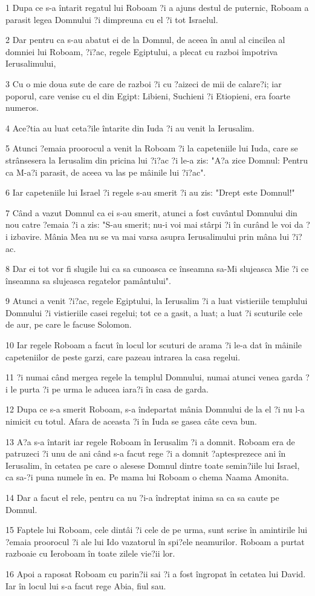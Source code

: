 \par 1 Dupa ce s-a întarit regatul lui Roboam ?i a ajuns destul de puternic, Roboam a parasit legea Domnului ?i dimpreuna cu el ?i tot Israelul.
\par 2 Dar pentru ca s-au abatut ei de la Domnul, de aceea în anul al cincilea al domniei lui Roboam, ?i?ac, regele Egiptului, a plecat cu razboi împotriva Ierusalimului,
\par 3 Cu o mie doua sute de care de razboi ?i cu ?aizeci de mii de calare?i; iar poporul, care venise cu el din Egipt: Libieni, Suchieni ?i Etiopieni, era foarte numeros.
\par 4 Ace?tia au luat ceta?ile întarite din Iuda ?i au venit la Ierusalim.
\par 5 Atunci ?emaia proorocul a venit la Roboam ?i la capeteniile lui Iuda, care se strânsesera la Ierusalim din pricina lui ?i?ac ?i le-a zis: "A?a zice Domnul: Pentru ca M-a?i parasit, de aceea va las pe mâinile lui ?i?ac".
\par 6 Iar capeteniile lui Israel ?i regele s-au smerit ?i au zis: "Drept este Domnul!"
\par 7 Când a vazut Domnul ca ei s-au smerit, atunci a fost cuvântul Domnului din nou catre ?emaia ?i a zis: "S-au smerit; nu-i voi mai stârpi ?i în curând le voi da ?i izbavire. Mânia Mea nu se va mai varsa asupra Ierusalimului prin mâna lui ?i?ac.
\par 8 Dar ei tot vor fi slugile lui ca sa cunoasca ce înseamna sa-Mi slujeasca Mie ?i ce înseamna sa slujeasca regatelor pamântului".
\par 9 Atunci a venit ?i?ac, regele Egiptului, la Ierusalim ?i a luat vistieriile templului Domnului ?i vistieriile casei regelui; tot ce a gasit, a luat; a luat ?i scuturile cele de aur, pe care le facuse Solomon.
\par 10 Iar regele Roboam a facut în locul lor scuturi de arama ?i le-a dat în mâinile capeteniilor de peste garzi, care pazeau intrarea la casa regelui.
\par 11 ?i numai când mergea regele la templul Domnului, numai atunci venea garda ?i le purta ?i pe urma le aducea iara?i în casa de garda.
\par 12 Dupa ce s-a smerit Roboam, s-a îndepartat mânia Domnului de la el ?i nu l-a nimicit cu totul. Afara de aceasta ?i în Iuda se gasea câte ceva bun.
\par 13 A?a s-a întarit iar regele Roboam în Ierusalim ?i a domnit. Roboam era de patruzeci ?i unu de ani când s-a facut rege ?i a domnit ?aptesprezece ani în Ierusalim, în cetatea pe care o alesese Domnul dintre toate semin?iile lui Israel, ca sa-?i puna numele în ea. Pe mama lui Roboam o chema Naama Amonita.
\par 14 Dar a facut el rele, pentru ca nu ?i-a îndreptat inima sa ca sa caute pe Domnul.
\par 15 Faptele lui Roboam, cele dintâi ?i cele de pe urma, sunt scrise în amintirile lui ?emaia proorocul ?i ale lui Ido vazatorul în spi?ele neamurilor. Roboam a purtat razboaie cu Ieroboam în toate zilele vie?ii lor.
\par 16 Apoi a raposat Roboam cu parin?ii sai ?i a fost îngropat în cetatea lui David. Iar în locul lui s-a facut rege Abia, fiul sau.

